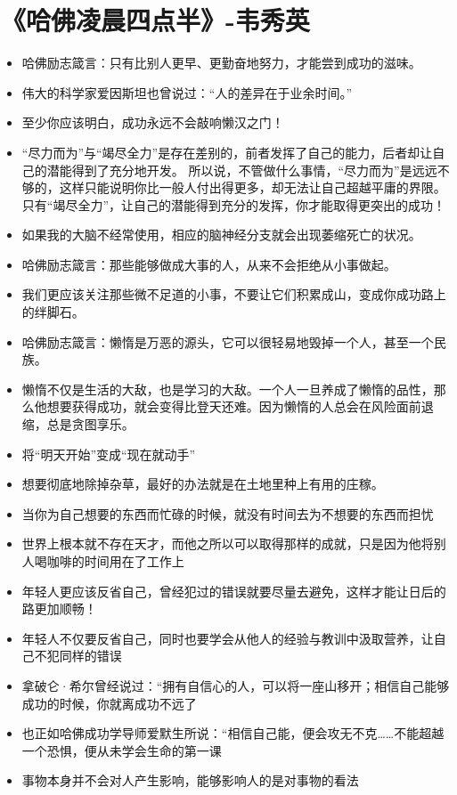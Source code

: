 \documentclass[UTF8,a4paper,8pt]{ctexart}
\begin{document}
 \section{《哈佛凌晨四点半》-韦秀英 }
 \begin{itemize}
 	\item 哈佛励志箴言：只有比别人更早、更勤奋地努力，才能尝到成功的滋味。
 	\item 伟大的科学家爱因斯坦也曾说过：“人的差异在于业余时间。”
 	\item 至少你应该明白，成功永远不会敲响懒汉之门！
 	\item “尽力而为”与“竭尽全力”是存在差别的，前者发挥了自己的能力，后者却让自己的潜能得到了充分地开发。 所以说，不管做什么事情，“尽力而为”是远远不够的，这样只能说明你比一般人付出得更多，却无法让自己超越平庸的界限。 只有“竭尽全力”，让自己的潜能得到充分的发挥，你才能取得更突出的成功！
 	\item 如果我的大脑不经常使用，相应的脑神经分支就会出现萎缩死亡的状况。
 	\item 哈佛励志箴言：那些能够做成大事的人，从来不会拒绝从小事做起。
 	\item 我们更应该关注那些微不足道的小事，不要让它们积累成山，变成你成功路上的绊脚石。
 	\item 哈佛励志箴言：懒惰是万恶的源头，它可以很轻易地毁掉一个人，甚至一个民族。
 	\item 懒惰不仅是生活的大敌，也是学习的大敌。一个人一旦养成了懒惰的品性，那么他想要获得成功，就会变得比登天还难。因为懒惰的人总会在风险面前退缩，总是贪图享乐。
 	\item 将“明天开始”变成“现在就动手”
 	\item 想要彻底地除掉杂草，最好的办法就是在土地里种上有用的庄稼。
 	\item 当你为自己想要的东西而忙碌的时候，就没有时间去为不想要的东西而担忧
 	\item 世界上根本就不存在天才，而他之所以可以取得那样的成就，只是因为他将别人喝咖啡的时间用在了工作上
 	\item 年轻人更应该反省自己，曾经犯过的错误就要尽量去避免，这样才能让日后的路更加顺畅！
 	\item 年轻人不仅要反省自己，同时也要学会从他人的经验与教训中汲取营养，让自己不犯同样的错误
 	\item 拿破仑·希尔曾经说过：“拥有自信心的人，可以将一座山移开；相信自己能够成功的时候，你就离成功不远了
 	\item 也正如哈佛成功学导师爱默生所说：“相信自己能，便会攻无不克……不能超越一个恐惧，便从未学会生命的第一课
 	\item 事物本身并不会对人产生影响，能够影响人的是对事物的看法

\end{itemize}
\end{document}
